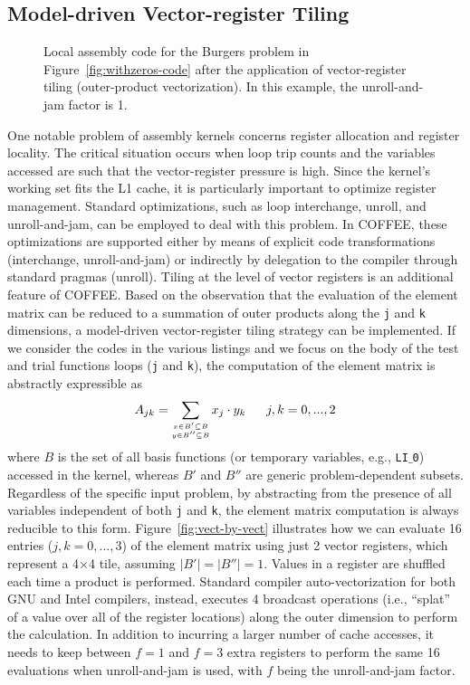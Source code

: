 \subsection{Model-driven Vector-register Tiling}
\label{sec:coffee-opvect}

\begin{figure}
\centering
\label{code:burgers-opvect}
\scriptsize

\caption{Local assembly code for the Burgers problem in Figure~\ref{fig:withzeros-code} after the application of vector-register tiling (outer-product vectorization). In this example, the unroll-and-jam factor is 1.}
\end{figure}

One notable problem of assembly kernels concerns register allocation and register locality. The critical situation occurs when loop trip counts and the variables accessed are such that the vector-register pressure is high. Since the kernel's working set fits the L1 cache, it is particularly important to optimize register management. Standard optimizations, such as loop interchange, unroll, and unroll-and-jam, can be employed to deal with this problem. In COFFEE, these optimizations are supported either by means of explicit code transformations (interchange, unroll-and-jam) or indirectly by delegation to the compiler through standard pragmas (unroll). Tiling at the level of vector registers is an additional feature of COFFEE. Based on the observation that the evaluation of the element matrix can be reduced to a summation of outer products along the \texttt{j} and \texttt{k} dimensions, a model-driven vector-register tiling strategy can be implemented. If we consider the codes in the various listings and we focus on the body of the test and trial functions loops (\texttt{j} and \texttt{k}), the computation of the element matrix is abstractly expressible as
\begin{equation}
\scriptsize
\label{outer-product}
A_{jk} = \sum_{\substack{
  x \in B' \subseteq B \\
  y \in B'' \subseteq B}}
x_j\cdot y_k ~~~~~~ j,k = 0,...,2
\end{equation}
where $B$ is the set of all basis functions (or temporary variables, e.g., \texttt{LI$\_$0}) accessed in the kernel, whereas $B'$ and $B''$ are generic problem-dependent subsets. Regardless of the specific input problem, by abstracting from the presence of all variables independent of both \texttt{j} and \texttt{k}, the element matrix computation is always reducible to this form. Figure~\ref{fig:vect-by-vect} illustrates how we can evaluate 16 entries ($j,k=0,...,3$) of the element matrix using just 2 vector registers, which represent a 4$\times$4 tile, assuming $\vert B' \vert = \vert B'' \vert = 1$. Values in a register are shuffled each time a product is performed. Standard compiler auto-vectorization for both GNU and Intel compilers, instead, executes 4 broadcast operations (i.e., ``splat'' of a value over all of the register locations) along the outer dimension to perform the calculation. In addition to incurring a larger number of cache accesses, it needs to keep between $f=1$ and $f=3$ extra registers to perform the same 16 evaluations when unroll-and-jam is used, with $f$ being the unroll-and-jam factor.

